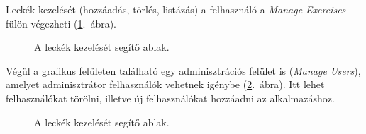 \documentclass[11pt, a4paper]{article}
\begin{document}
     Leckék kezelését (hozzáadás, törlés, listázás) a felhasználó a \emph{Manage Exercises} fülön végezheti (\ref{fig:manage-exercises}.~ábra).
     \begin{figure}[h!]
     	\center
     	\caption{A leckék kezelését segítő ablak.}
     	\label{fig:manage-exercises}
     \end{figure}
     Végül a grafikus felületen található egy adminisztrációs felület is (\emph{Manage Users}), amelyet adminisztrátor felhasználók vehetnek igénybe (\ref{fig:manage-users}.~ábra). Itt lehet felhasználókat törölni, illetve új felhasználókat hozzáadni az alkalmazáshoz.    
     \begin{figure}[h!]
     	\center
     	\caption{A leckék kezelését segítő ablak.}
     	\label{fig:manage-users}
     \end{figure}
 
\end{document}
